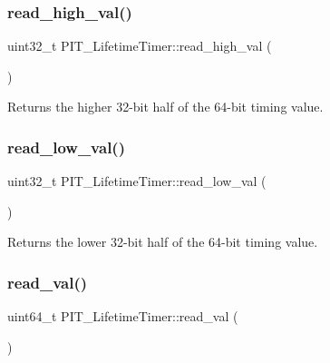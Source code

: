\subsubsection{\texorpdfstring{read\+\_\+high\+\_\+val()}{read\_high\_val()}}
{\footnotesize\ttfamily uint32\+\_\+t P\+I\+T\+\_\+\+Lifetime\+Timer\+::read\+\_\+high\+\_\+val (\begin{DoxyParamCaption}{ }\end{DoxyParamCaption})\hspace{0.3cm}{\ttfamily [inline]}}



Returns the higher 32-\/bit half of the 64-\/bit timing value. 

\mbox{\label{classPIT__LifetimeTimer_a4f7f8cd3847b9edb19dfa27f048a08cc}} 
\subsubsection{\texorpdfstring{read\+\_\+low\+\_\+val()}{read\_low\_val()}}
{\footnotesize\ttfamily uint32\+\_\+t P\+I\+T\+\_\+\+Lifetime\+Timer\+::read\+\_\+low\+\_\+val (\begin{DoxyParamCaption}{ }\end{DoxyParamCaption})\hspace{0.3cm}{\ttfamily [inline]}}



Returns the lower 32-\/bit half of the 64-\/bit timing value. 

\mbox{\label{classPIT__LifetimeTimer_a4ee08cce7812322a7a10fcba0463476c}} 
\subsubsection{\texorpdfstring{read\+\_\+val()}{read\_val()}}
{\footnotesize\ttfamily uint64\+\_\+t P\+I\+T\+\_\+\+Lifetime\+Timer\+::read\+\_\+val (\begin{DoxyParamCaption}{ }\end{DoxyParamCaption})\hspace{0.3cm}{\ttfamily [inline]}}



